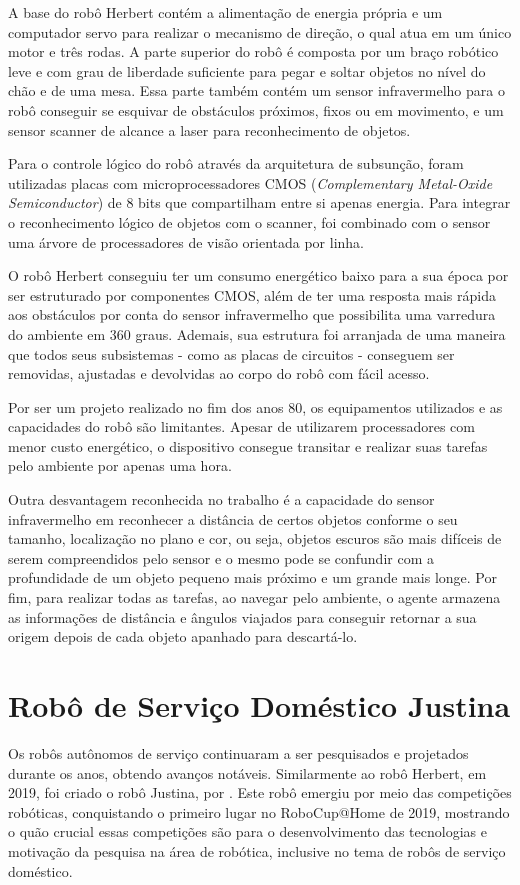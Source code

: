 A base do robô Herbert contém a alimentação de energia própria e um computador servo para realizar o mecanismo de direção, o qual atua em um único motor e três rodas. A parte superior do robô é composta por um braço robótico leve e com grau de liberdade suficiente para pegar e soltar objetos no nível do chão e de uma mesa. Essa parte também contém um sensor infravermelho para o robô conseguir se esquivar de obstáculos próximos, fixos ou em movimento, e um sensor scanner de alcance a laser para reconhecimento de objetos. 

Para o controle lógico do robô através da arquitetura de subsunção, foram utilizadas placas com microprocessadores CMOS (\textit{Complementary Metal-Oxide Semiconductor}) de 8 bits  que compartilham entre si apenas energia. Para integrar o reconhecimento lógico de objetos com o scanner, foi combinado com o sensor uma árvore de processadores de visão orientada por linha. 

O robô Herbert conseguiu ter um consumo energético baixo para a sua época por ser estruturado por componentes CMOS, além de ter uma resposta mais rápida aos obstáculos por conta do sensor infravermelho que possibilita uma varredura do ambiente em 360 graus. Ademais, sua estrutura foi arranjada de uma maneira que todos seus subsistemas - como as placas de circuitos -  conseguem ser removidas, ajustadas e devolvidas ao corpo do robô com fácil acesso. 

Por ser um projeto realizado no fim dos anos 80, os equipamentos utilizados e as capacidades do robô são limitantes. Apesar de utilizarem processadores com menor custo energético, o dispositivo consegue transitar e realizar suas tarefas pelo ambiente por apenas uma hora. 

Outra desvantagem reconhecida no trabalho é a capacidade do sensor infravermelho em reconhecer a distância de certos objetos conforme o seu tamanho, localização no plano e cor, ou seja, objetos escuros são mais difíceis de serem compreendidos pelo sensor e o mesmo pode se confundir com a profundidade de um objeto pequeno mais próximo e um grande mais longe. Por fim, para realizar todas as tarefas, ao navegar pelo ambiente, o agente armazena as informações de distância e ângulos viajados para conseguir retornar a sua origem depois de cada objeto apanhado para descartá-lo.

\section{Robô de Serviço Doméstico Justina}
Os robôs autônomos de serviço continuaram a ser pesquisados e projetados durante os anos, obtendo avanços notáveis. Similarmente ao robô Herbert, em 2019, foi criado o robô Justina, por \citet{justina:2019}. Este robô emergiu por meio das competições robóticas, conquistando o primeiro lugar no RoboCup@Home de 2019, mostrando o quão crucial essas competições são para o desenvolvimento das tecnologias e motivação da pesquisa na área de robótica, inclusive no tema de robôs de serviço doméstico. 

